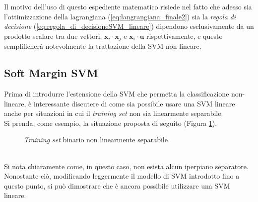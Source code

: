 Il motivo dell'uso di questo espediente matematico risiede nel fatto che adesso sia l'ottimizzazione della lagrangiana (\ref{eq:langrangiana_finale2}) sia la \emph{regola di decisione} (\ref{eq:regola_di_decisioneSVM_lineare}) dipendono esclusivamente da un prodotto scalare tra due vettori, $\mathbf{x}_i\cdot\mathbf{x}_j$ e $\mathbf{x}_i\cdot\mathbf{u}$ rispettivamente, e questo semplificherà notevolmente la trattazione della SVM non lineare. 

\subsection{Soft Margin SVM}
Prima di introdurre l'estensione della SVM che permetta la classificazione non-lineare, è interessante discutere di come sia possibile usare una SVM lineare anche per situazioni in cui il \emph{training set} non sia linearmente separabile.\\
Si prenda, come esempio, la situazione proposta di seguito (Figura \ref{fig:Dataset_nonseparabile}).
 \begin{figure}[!ht]
 \center
{}
    \caption{\emph{Training set} binario non linearmente separabile}
    \label{fig:Dataset_nonseparabile}
  \end{figure}
\\
Si nota chiaramente come, in questo caso, non esista alcun iperpiano separatore. 
Nonostante ciò, modificando leggermente il modello di SVM introdotto fino a questo punto, si può dimostrare che è ancora possibile utilizzare una SVM lineare.\\

